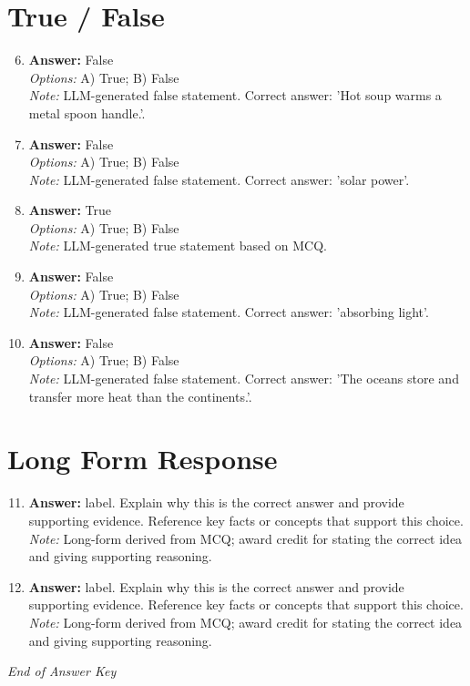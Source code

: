 \documentclass[12pt]{article}
\begin{document}
\section*{True / False}
\begin{enumerate}[label=\arabic*.]
\setcounter{enumi}{5}
\item \textbf{Answer:} False
\\ \textit{Options:} A) True; B) False
\\ \textit{Note:} LLM-generated false statement. Correct answer: 'Hot soup warms a metal spoon handle.'.
\item \textbf{Answer:} False
\\ \textit{Options:} A) True; B) False
\\ \textit{Note:} LLM-generated false statement. Correct answer: 'solar power'.
\item \textbf{Answer:} True
\\ \textit{Options:} A) True; B) False
\\ \textit{Note:} LLM-generated true statement based on MCQ.
\item \textbf{Answer:} False
\\ \textit{Options:} A) True; B) False
\\ \textit{Note:} LLM-generated false statement. Correct answer: 'absorbing light'.
\item \textbf{Answer:} False
\\ \textit{Options:} A) True; B) False
\\ \textit{Note:} LLM-generated false statement. Correct answer: 'The oceans store and transfer more heat than the continents.'.
\end{enumerate}

\section*{Long Form Response}
\begin{enumerate}[label=\arabic*.]
\setcounter{enumi}{10}
\item \textbf{Answer:} label. Explain why this is the correct answer and provide supporting evidence. Reference key facts or concepts that support this choice.
\\ \textit{Note:} Long-form derived from MCQ; award credit for stating the correct idea and giving supporting reasoning.
\item \textbf{Answer:} label. Explain why this is the correct answer and provide supporting evidence. Reference key facts or concepts that support this choice.
\\ \textit{Note:} Long-form derived from MCQ; award credit for stating the correct idea and giving supporting reasoning.
\end{enumerate}

\vfill
\noindent\textit{End of Answer Key}
\end{document}
